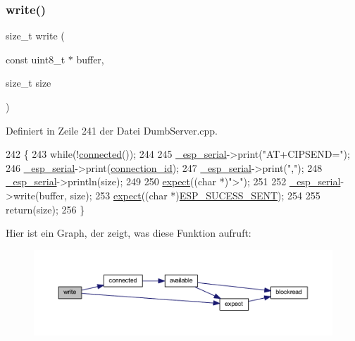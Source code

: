 \mbox{\label{class_esp_server_a7c66fc8d559f4956d4ccea196299bca7}} 
\subsubsection{\texorpdfstring{write()}{write()}\hspace{0.1cm}{\footnotesize\ttfamily [1/6]}}
{\footnotesize\ttfamily size\+\_\+t write (\begin{DoxyParamCaption}\item[{const uint8\+\_\+t $\ast$}]{buffer,  }\item[{size\+\_\+t}]{size }\end{DoxyParamCaption})\hspace{0.3cm}{\ttfamily [virtual]}}



Definiert in Zeile 241 der Datei Dumb\+Server.\+cpp.


\begin{DoxyCode}
242 \{
243   \textcolor{keywordflow}{while}(!\hyperlink{class_esp_server_a59fc494d53391b27e2fd75cb750690d9}{connected}());
244 
245   \hyperlink{class_esp_server_a552aab874ad99b696f4c997d6f5a4746}{\_esp\_serial}->print(\textcolor{stringliteral}{"AT+CIPSEND="});
246   \hyperlink{class_esp_server_a552aab874ad99b696f4c997d6f5a4746}{\_esp\_serial}->print(\hyperlink{class_esp_server_a821bd4e05f0b260cc584a2d23bda0fff}{connection\_id});
247   \hyperlink{class_esp_server_a552aab874ad99b696f4c997d6f5a4746}{\_esp\_serial}->print(\textcolor{stringliteral}{","});
248   \hyperlink{class_esp_server_a552aab874ad99b696f4c997d6f5a4746}{\_esp\_serial}->println(size);
249 
250   \hyperlink{class_esp_server_aff5ea67ab96af075223b2b836036ccf1}{expect}((\textcolor{keywordtype}{char} *)\textcolor{stringliteral}{">"});
251 
252   \hyperlink{class_esp_server_a552aab874ad99b696f4c997d6f5a4746}{\_esp\_serial}->write(buffer, size);
253   \hyperlink{class_esp_server_aff5ea67ab96af075223b2b836036ccf1}{expect}((\textcolor{keywordtype}{char} *)\hyperlink{_dumb_server_8cpp_a3df41d167aea12431009366bf32f28b3}{ESP\_SUCESS\_SENT});
254 
255   \textcolor{keywordflow}{return}(size);
256 \}
\end{DoxyCode}
Hier ist ein Graph, der zeigt, was diese Funktion aufruft\+:\nopagebreak
\begin{figure}[H]
\begin{center}
\leavevmode
\includegraphics[width=350pt]{class_esp_server_a7c66fc8d559f4956d4ccea196299bca7_cgraph}
\end{center}
\end{figure}
\mbox{\label{class_esp_server_af32c245c813bbadb566538bba418b0fe}} 
